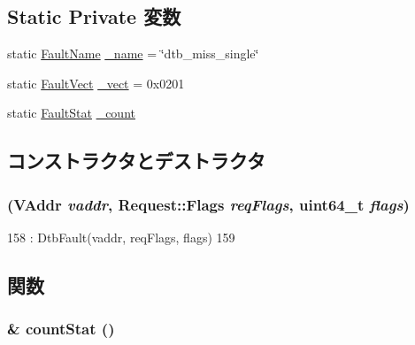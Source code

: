 \subsection*{Static Private 変数}
\begin{DoxyCompactItemize}
\item 
static \hyperlink{sim_2faults_8hh_abb196df64725e5c2568c900cf130d8d7}{FaultName} \hyperlink{classAlphaISA_1_1NDtbMissFault_ac79073ffcd2c66a09bcd3bd3ad206019}{\_\-name} = \char`\"{}dtb\_\-miss\_\-single\char`\"{}
\item 
static \hyperlink{classm5_1_1params_1_1Addr}{FaultVect} \hyperlink{classAlphaISA_1_1NDtbMissFault_ad9e5855b9db0b2824cf6c507be4a872e}{\_\-vect} = 0x0201
\item 
static \hyperlink{classStats_1_1Scalar}{FaultStat} \hyperlink{classAlphaISA_1_1NDtbMissFault_a4bff925c412f331c5aaf6a39b79619ff}{\_\-count}
\end{DoxyCompactItemize}


\subsection{コンストラクタとデストラクタ}
\hypertarget{classAlphaISA_1_1NDtbMissFault_a47ceca6a0cb3454cf788705e9abc1510}{
\subsubsection[{NDtbMissFault}]{ ({\bf VAddr} {\em vaddr}, \/  {\bf Request::Flags} {\em reqFlags}, \/  uint64\_\-t {\em flags})}}
\label{classAlphaISA_1_1NDtbMissFault_a47ceca6a0cb3454cf788705e9abc1510}



\begin{DoxyCode}
158         : DtbFault(vaddr, reqFlags, flags)
159     { }
\end{DoxyCode}


\subsection{関数}
\hypertarget{classAlphaISA_1_1NDtbMissFault_a6c79663c761ff57265459f7e3aefaf4c}{
\subsubsection[{countStat}]{\& countStat ()}}
\label{classAlphaISA_1_1NDtbMissFault_a6c79663c761ff57265459f7e3aefaf4c}


